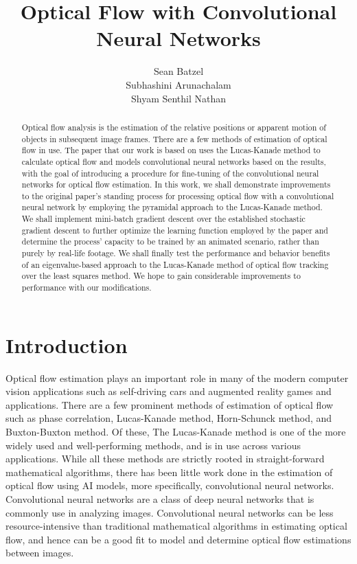 \documentclass[]{article}
\title{Optical Flow with Convolutional Neural Networks}
\author{Sean Batzel\\Subhashini Arunachalam\\Shyam Senthil Nathan}
\begin{document}
\maketitle
\nocite{*}

\begin{abstract}
    Optical flow analysis is the estimation of the relative positions or apparent motion of objects in subsequent image frames.
    There are a few methods of estimation of optical flow in use.
    The paper that our work is based on uses the Lucas-Kanade method to calculate optical flow and models convolutional neural networks based on the results, with the goal of introducing a procedure for fine-tuning of the convolutional neural networks for optical flow estimation.
    In this work, we shall demonstrate improvements to the original paper’s standing process for processing optical flow with a convolutional neural network by employing the pyramidal approach to the Lucas-Kanade method.
    We shall implement mini-batch gradient descent over the established stochastic gradient descent to further optimize the learning function employed by the paper and determine the process’ capacity to be trained by an animated scenario, rather than purely by real-life footage.
    We shall finally test the performance and behavior benefits of an eigenvalue-based approach to the Lucas-Kanade method of optical flow tracking over the least squares method.
    We hope to gain considerable improvements to performance with our modifications.
\end{abstract}

\section{Introduction}\label{sec:introduction}
Optical flow estimation plays an important role in many of the modern computer vision applications such as self-driving cars and augmented reality games and applications. 
There are a few prominent methods of estimation of optical flow such as phase correlation, Lucas-Kanade method, Horn-Schunck method, and Buxton-Buxton method. Of these, The Lucas-Kanade method is one of the more widely used and well-performing methods, and is in use across various applications. 
While all these methods are strictly rooted in straight-forward mathematical algorithms, there has been little work done in the estimation of optical flow using AI models, more specifically, convolutional neural networks. 
Convolutional neural networks are a class of deep neural networks that is commonly use in analyzing images. 
Convolutional neural networks can be less resource-intensive than traditional mathematical algorithms in estimating optical flow, and hence can be a good fit to model and determine optical flow estimations between images.
\end{document}
